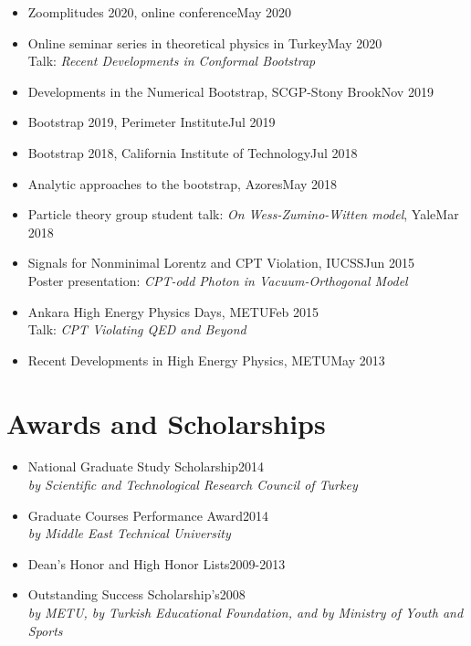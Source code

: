 \documentclass[a4paper,11pt]{article}
\begin{document}
\begin{itemize}[itemsep=.001em]
	\item[] Zoomplitudes 2020, online conference\hfill May 2020
	\item[] Online seminar series in theoretical physics in Turkey\hfill May 2020\\
	\hspace*{1.8em}Talk: \emph{Recent Developments in Conformal Bootstrap}
	\item[] Developments in the Numerical Bootstrap, SCGP-Stony Brook\hfill Nov 2019\\
	\item[] Bootstrap 2019, Perimeter Institute\hfill Jul 2019
	\item[]Bootstrap 2018, California Institute of Technology\hfill  Jul 2018
	\item[] Analytic approaches to the bootstrap, Azores\hfill May 2018
	\item[] Particle theory group student talk: \emph{On Wess-Zumino-Witten model}, Yale\hfill Mar 2018
	\item[] Signals for Nonminimal Lorentz and CPT Violation, IUCSS\hfill Jun 2015\\
					\hspace*{1.8em}Poster presentation: \emph{CPT-odd Photon in Vacuum-Orthogonal Model}
	\item[] Ankara High Energy Physics Days, METU\hfill Feb 2015\\
					\hspace*{1.8em}Talk: \emph{CPT Violating QED and Beyond}
	\item[] Recent Developments in High Energy Physics, METU\hfill May 2013
\end{itemize}

\section{\textcolor{burntorange}{Awards and Scholarships}}
\begin{itemize}[itemsep=.001em] 
	\item[]  National Graduate Study Scholarship\hfill 2014\\
	\hspace*{1.8em}\emph{by Scientific and Technological Research Council of Turkey}
	\item[]  Graduate Courses Performance Award\hfill 2014\\
		\hspace*{1.8em}\emph{by Middle East Technical University}	
	\item[] Dean’s Honor and High Honor Lists\hfill 2009-2013

	\item[] Outstanding Success Scholarship's\hfill 2008\\
		\hspace*{1.8em}\emph{by METU, by Turkish Educational Foundation, and by Ministry of Youth and Sports}
\end{itemize}
\end{document}
